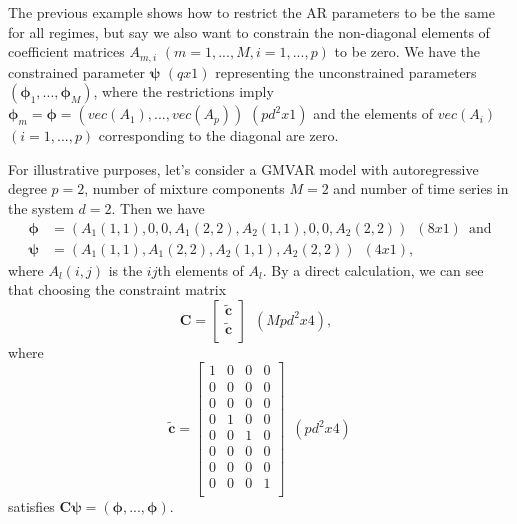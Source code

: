 \documentclass[nojss]{jss}
\begin{document}
The previous example shows how to restrict the AR parameters to be the same for all regimes, but say we also want to constrain the non-diagonal elements of coefficient matrices $A_{m,i}$ $(m=1,...,M, i=1,...,p)$ to be zero. We have the constrained parameter $\boldsymbol{\psi}$ $(qx1)$ representing the unconstrained parameters $(\boldsymbol{\phi}_1,...,\boldsymbol{\phi}_M)$, where the restrictions imply $\boldsymbol{\phi}_m=\boldsymbol{\phi}=(vec(A_1),...,vec(A_p))$ $(pd^2x1)$ and the elements of $vec(A_i)$ $(i=1,...,p)$ corresponding to the diagonal are zero.

For illustrative purposes, let's consider a GMVAR model with autoregressive degree $p=2$, number of mixture components $M=2$ and number of time series in the system $d=2$. Then we have
\begin{align}
\boldsymbol{\phi}&=(A_1(1,1),0,0,A_1(2,2),A_2(1,1),0,0,A_2(2,2)) \enspace (8x1) \enspace \text{and}\\
\boldsymbol{\psi}&=(A_1(1,1),A_1(2,2),A_2(1,1),A_2(2,2)) \enspace (4x1),
\end{align}
where $A_l(i,j)$ is the $ij$th elements of $A_l$. By a direct calculation, we can see that choosing the constraint matrix
\begin{equation}
\boldsymbol{C}=\left[{\begin{array}{c}
   \boldsymbol{\tilde{c}} \\
   \boldsymbol{\tilde{c}} \\
  \end{array}}\right]
\enspace (Mpd^2x4),
\enspace
\end{equation}
where
\begin{equation}
\boldsymbol{\tilde{c}}=\left[{\begin{array}{cccc}
   1 & 0 & 0 & 0 \\
   0 & 0 & 0 & 0 \\
   0 & 0 & 0 & 0 \\
   0 & 1 & 0 & 0 \\
   0 & 0 & 1 & 0 \\
   0 & 0 & 0 & 0 \\
   0 & 0 & 0 & 0 \\
   0 & 0 & 0 & 1 \\
  \end{array}}\right]
\enspace (pd^2x4)
\end{equation}
satisfies $\boldsymbol{C}\boldsymbol{\psi}=(\boldsymbol{\phi},...,\boldsymbol{\phi}).$
\end{document}

